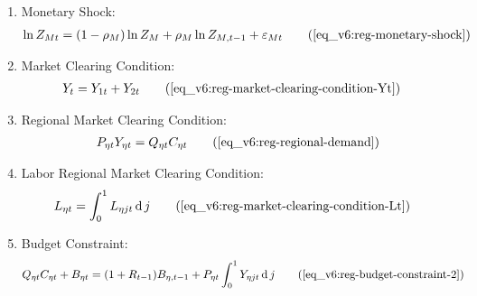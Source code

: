 \documentclass[../thesis.tex]{subfiles}
\begin{document}
{\begin{itemize}
\begin{enumerate}
		\item Monetary Shock:
		\begin{align}
			\ln{Z_{Mt}} = (1-\rho_M)\ln{Z_{M}} + \rho_M\ln{Z_{M,t-1}} + \varepsilon_{Mt} \tag{\ref{eq_v6:reg-monetary-shock}}
		\end{align}

		\item Market Clearing Condition:
		\begin{align}
			Y_{t} &= Y_{1 t} + Y_{2 t} \tag{\ref{eq_v6:reg-market-clearing-condition-Yt}}
		\end{align}

		\item Regional Market Clearing Condition: 
		\begin{align}
			P_{\eta t} Y_{\eta t} = Q_{\eta t} C_{\eta t} \tag{\ref{eq_v6:reg-regional-demand}}
		\end{align}
		
		\item Labor Regional Market Clearing Condition: 
		\begin{align}
			L_{\eta t} &= \int_{0}^{1} L_{\eta jt} \dif j \tag{\ref{eq_v6:reg-market-clearing-condition-Lt}}
		\end{align}

		\item Budget Constraint:
		\begin{align}
			Q_{\eta t} C_{\eta t} + B_{\eta t} &= (1 + R_{t-1}) B_{\eta,t-1} + P_{\eta t} \int_{0}^{1} Y_{\eta jt} \dif j \tag{\ref{eq_v6:reg-budget-constraint-2}}
		\end{align}
						
		\end{enumerate}
		
	\end{itemize}
	
} %
\end{document}
